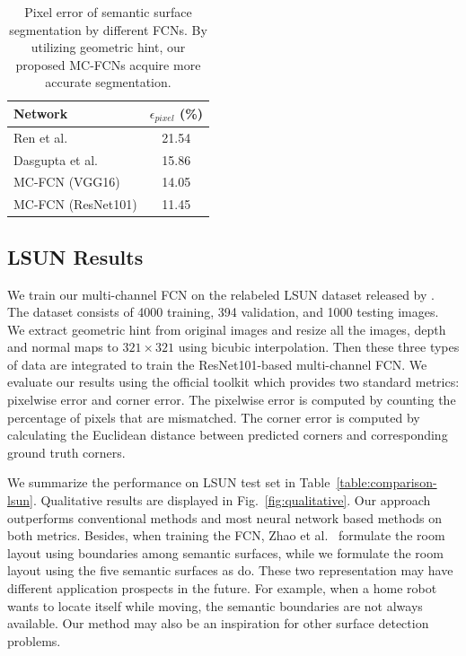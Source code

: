 \begin{table}
	\centering
	\begin{tabular}{l|c} 
		\hline
		Network & $\epsilon_{pixel}$ (\%)\\
		\hline
		Ren et al.~\cite{ren2016coarse} & 21.54 \\
		Dasgupta et al.~\cite{dasgupta2016delay} & 15.86 \\  \hline
		MC-FCN (VGG16)  & 14.05 \\
		MC-FCN (ResNet101) & 11.45 \\
		\hline
	\end{tabular}
	\caption{Pixel error of semantic surface segmentation by different FCNs. By utilizing geometric hint, our proposed MC-FCNs acquire more accurate segmentation. }	
	\label{table:ablation}
\end{table}

\subsection{LSUN Results}
\label{sec:LSUN}
We train our multi-channel FCN on the relabeled LSUN dataset released by \cite{ren2016coarse}. The dataset consists of 4000 training, 394 validation, and 1000 testing images. We extract geometric hint from original images and resize all the images, depth and normal maps to $321\times321$ using bicubic interpolation. Then these three types of data are integrated to train the ResNet101-based multi-channel FCN. We evaluate our results using the official toolkit which provides two standard metrics: pixelwise error and corner error. The pixelwise error is computed by counting the percentage of pixels that are mismatched. The corner error is computed by calculating the Euclidean distance between predicted corners and corresponding ground truth corners.

We summarize the performance on LSUN test set in Table~\ref{table:comparison-lsun}. Qualitative results are displayed in Fig.~\ref{fig:qualitative}. Our approach outperforms conventional methods \cite{hedau2009recovering} and most neural network based methods  \cite{mallya2015learning,zhang2017learning,dasgupta2016delay,ren2016coarse,LeeRoomNet17} on both metrics. 
%
Besides, when training the FCN, Zhao et al.~\cite{zhao2017physics} formulate the room layout using boundaries among semantic surfaces, while we formulate the room layout using the five semantic surfaces as \cite{dasgupta2016delay} do. These two representation may have different application prospects in the future. For example, when a home robot wants to locate itself while moving, the semantic boundaries are not always available. Our method may also be an inspiration for other surface detection problems.

